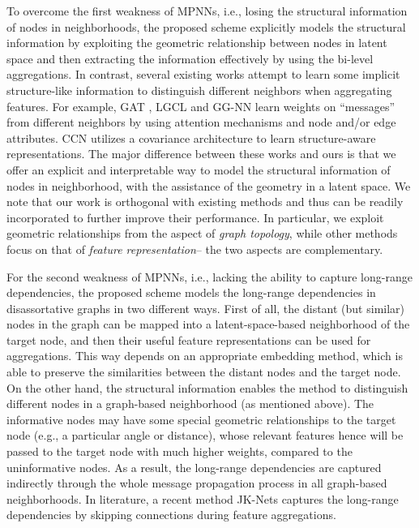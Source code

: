 \documentclass{article} \usepackage{iclr2020_conference,times}
\begin{document}
To overcome the first weakness of MPNNs, i.e.,  losing the structural information of nodes in neighborhoods, the proposed scheme explicitly models the structural information by exploiting the geometric relationship between nodes in  latent space and then extracting the information effectively by using the bi-level aggregations. 
In contrast, several existing works attempt to learn some implicit structure-like information to distinguish different neighbors when aggregating features. 
For example, GAT \citep{DBLP:journals/corr/abs-1710-10903}, LGCL \citep{gao2018large} and GG-NN \citep{DBLP:journals/corr/LiTBZ15} learn weights on ``messages'' from different neighbors by using attention mechanisms and node and/or edge attributes. 
CCN \citep{DBLP:conf/iclr/KondorSPAT18} utilizes a covariance architecture to learn structure-aware representations.
The major difference between these works and ours is that we offer an explicit and interpretable way to model the structural information of nodes in neighborhood, with the assistance of the geometry in a latent space.
We note that our work is orthogonal with existing methods and thus can be readily incorporated to further improve their performance.
In particular, we exploit geometric relationships from the aspect of \emph{graph topology}, while other methods focus on that of \emph{feature representation}-- the two aspects are complementary. 

For the second weakness of MPNNs, i.e., lacking the ability to capture long-range dependencies, the proposed scheme models the long-range dependencies in disassortative graphs in two different ways. 
First of all, the distant (but similar) nodes in the graph can be mapped into a latent-space-based neighborhood of the target node, and then their useful feature representations can be used for aggregations. 
This way depends on an appropriate embedding method, which is able to preserve the similarities between the distant nodes and the target node. 
On the other hand, the structural information enables the method to distinguish different nodes in a graph-based neighborhood (as mentioned above). 
The informative nodes may have some special geometric relationships to the target node (e.g., a particular angle or distance), whose relevant features hence will be passed to the target node with much higher weights, compared to the uninformative nodes. 
As a result, the long-range dependencies are captured indirectly through the whole message propagation process in all graph-based neighborhoods. 
In literature, a recent method JK-Nets \citep{DBLP:conf/icml/XuLTSKJ18} captures the long-range dependencies by skipping connections during feature aggregations.
\end{document}
